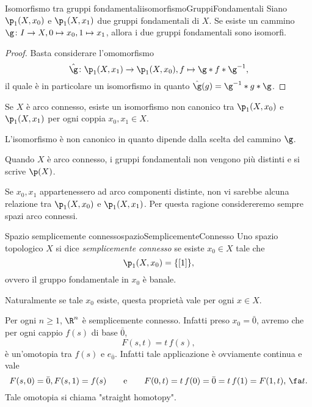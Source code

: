 \begin{prop}{Isomorfismo tra gruppi fondamentali}{isomorfismoGruppiFondamentali}
	Siano \(\p_1(X,x_0)\) e \(\p_1(X,x_1)\) due gruppi fondamentali di \(X\).
	Se esiste un cammino \(\g\colon I \to X, 0 \mapsto x_0, 1 \mapsto x_1\), allora i due gruppi fondamentali sono isomorfi.
\end{prop}

\begin{proof}
	Basta considerare l'omomorfismo
	\[
		\hat{\g}\colon \p_1(X,x_1) \to \p_1(X,x_0), f \mapsto \g * f * \g^{-1},
	\]
	il quale è in particolare un isomorfismo in quanto \(\hat{\g}(g) = \g^{-1} * g * \g\).
\end{proof}

\begin{cor}
	Se \(X\) è arco connesso, esiste un isomorfismo non canonico tra \(\p_1(X,x_0)\) e \(\p_1(X,x_1)\) per ogni coppia \(x_0,x_1\in X\).
\end{cor}

\begin{oss}
	L'isomorfismo è non canonico in quanto dipende dalla scelta del cammino \(\g\).
\end{oss}

\begin{notz}
	Quando \(X\) è arco connesso, i gruppi fondamentali non vengono più distinti e si scrive \(\p(X)\).
\end{notz}

\begin{oss}
	Se \(x_0,x_1\) appartenessero ad arco componenti distinte, non vi sarebbe alcuna relazione tra \(\p_1(X,x_0)\) e \(\p_1(X,x_1)\).
	Per questa ragione considereremo sempre spazi arco connessi.
\end{oss}

\begin{defn}{Spazio semplicemente connesso}{spazioSemplicementeConnesso}
	Uno spazio topologico \(X\) si dice \emph{semplicemente connesso} se esiste \(x_0\in X\) tale che
	\[
		\p_1(X,x_0) = \{[1]\},
	\]
	ovvero il gruppo fondamentale in \(x_0\) è banale.
\end{defn}

\begin{oss}
	Naturalmente se tale \(x_0\) esiste, questa proprietà vale per ogni \(x\in X\).
\end{oss}

\begin{ese}
	Per ogni \(n\ge 1\), \(\R^n\) è semplicemente connesso.
	Infatti preso \(x_0 = \bar{0}\), avremo che per ogni cappio \(f(s)\) di base \(\bar{0}\),
	\[
		F(s,t) = t\,f(s),
	\]
	è un'omotopia tra \(f(s)\) e \(e_{\bar{0}}\).
	Infatti tale applicazione è ovviamente continua e vale
	\[
		F(s,0) = \bar{0}, F(s,1) = f(s) \qquad\text{e}\qquad F(0,t)= t\,f(0)=\bar{0} = t\,f(1) = F(1,t),\,\fa t.
	\]
	Tale omotopia si chiama "straight homotopy".
\end{ese}

